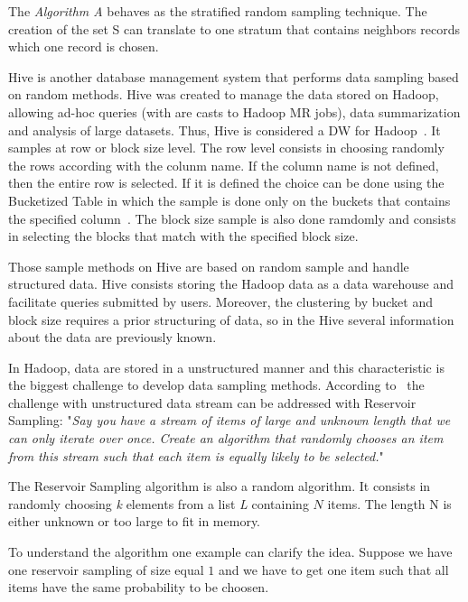 The {\it Algorithm A} behaves as the stratified random sampling technique. The creation
of the set S can translate to one stratum that contains neighbors records which one
record is chosen.

Hive is another database management system that performs data sampling based on
random methods. Hive was created to manage the data stored on Hadoop, allowing ad-hoc
queries (with are casts to Hadoop MR jobs), data summarization and analysis of
large datasets. Thus, Hive is considered a DW for Hadoop~\cite{hiveWiki}. It samples at
row or block size level. The row level consists in choosing randomly the rows
according with the colunm name. If the column name is not defined, then the entire row
is selected. If it is defined the choice can be done using the Bucketized Table
in which the sample is done only on the buckets that contains
the specified column~\cite{hiveSample}. The block size sample is also done ramdomly
and consists in selecting the blocks that match with the specified block size.

Those sample methods on Hive are based on random sample and handle structured data.
Hive consists storing the Hadoop data as a data warehouse and facilitate
queries submitted by users. Moreover, the clustering by bucket and block size
requires a prior structuring of data, so in the Hive several information about the
data are previously known.

In Hadoop, data are stored in a unstructured manner and this characteristic is the
biggest challenge to develop data sampling methods. According to~\cite{vitter:1985, cloudera, greg, wikipedia:ReservoirSampling}
the challenge with unstructured data stream can be addressed with Reservoir Sampling:
"{\it Say you have a stream of items of large and unknown length that we can only
iterate over once. Create an algorithm that randomly chooses an item from this
stream such that each item is equally likely to be selected.}"

The Reservoir Sampling algorithm is also a random algorithm. It consists in
randomly choosing {\it k} elements from a list {\it L} containing $N$ items.
The length N is either unknown or too large to fit in memory.

To understand the algorithm one example can clarify the idea. Suppose we have one
reservoir sampling of size equal $1$ and we have to get one item such
that all items have the same probability to be choosen.

